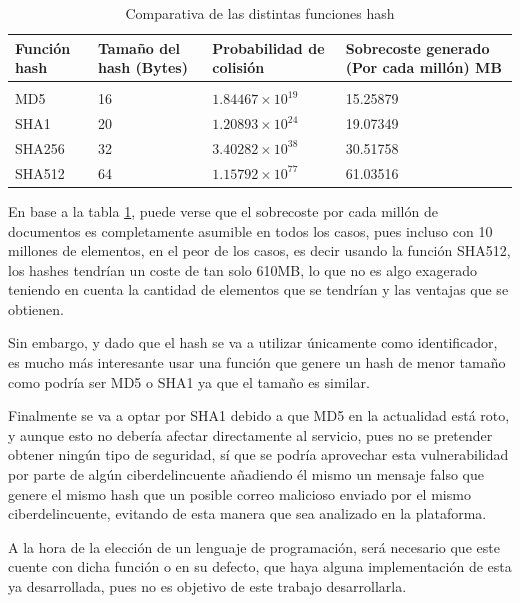 \begin{table}[htbp]
    \begin{center}
        \begin{tabular}{| m{1.5cm} || m{2.3cm} | m{3cm} | m{3.8cm} |}
            \hline
            Función hash	& Tamaño del hash (Bytes) & Probabilidad de colisión &	Sobrecoste generado (Por cada millón) MB \\ 
            \hline \hline 
             & & &\\  [0.03cm]
            MD5	    & 16	& \(1.84467\times10^{19}\)	    & 15.25879 \\  [0.3cm]
            SHA1	& 20	& \(1.20893\times10^{24}\)	& 19.07349 \\ [0.3cm]
            SHA256	& 32	& \(3.40282\times10^{38}\)	& 30.51758 \\ [0.3cm]
            SHA512	& 64	& \(1.15792  \times10^{77}	 \)    & 61.03516 \\ [0.3cm]
            \hline
        \end{tabular}
    \caption{Comparativa de las distintas funciones hash}
    \label{table:funciones_hash}
    \end{center}
\end{table}

En base a la tabla \ref{table:funciones_hash}, puede verse que el sobrecoste por cada millón de documentos es completamente asumible en todos los casos, pues incluso con 10 millones de elementos, en el peor de los casos, es decir usando la función SHA512, los hashes tendrían un coste de tan solo 610MB, lo que no es algo exagerado teniendo en cuenta la cantidad de elementos que se tendrían y las ventajas que se obtienen. 

Sin embargo, y dado que el hash se va a utilizar únicamente como identificador, es mucho más interesante usar una función que genere un hash de menor tamaño como podría ser MD5 o SHA1 ya que el tamaño es similar. 

Finalmente se va a optar por SHA1 debido a que MD5 en la actualidad está roto, y aunque esto no debería afectar directamente al servicio, pues no se pretender obtener ningún tipo de seguridad, sí que se podría aprovechar esta vulnerabilidad por parte de algún ciberdelincuente añadiendo él mismo un mensaje falso que genere el mismo hash que un posible correo malicioso enviado por el mismo ciberdelincuente, evitando de esta manera que sea analizado en la plataforma. 

A la hora de la elección de un lenguaje de programación, será necesario que este cuente con dicha función o en su defecto, que haya alguna implementación de esta ya desarrollada, pues no es objetivo de este trabajo desarrollarla.

